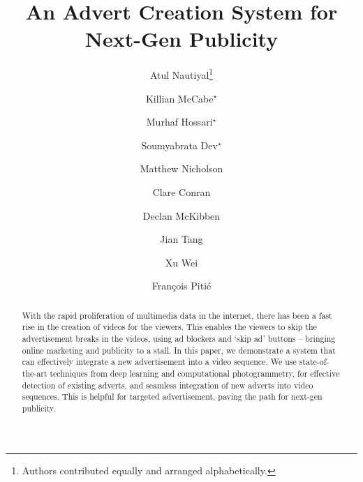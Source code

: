 \documentclass[runningheads]{llncs}
\begin{document}
%
\title{An Advert Creation System for \\Next-Gen Publicity }
%

\author{
Atul Nautiyal\thanks{Authors contributed equally and arranged alphabetically.} \and
Killian McCabe$^{\star}$ \and
Murhaf Hossari$^{\star}$ \and 
Soumyabrata Dev$^{\star}$ \and 
Matthew Nicholson \and  
Clare Conran \and 
Declan McKibben \and 
Jian Tang \and 
Xu Wei \and 
Fran\c{c}ois Piti\'e
}
%
%




\maketitle              %
%
\begin{abstract}
With the rapid proliferation of multimedia data in the internet, there has been a fast rise in the creation of videos for the viewers. This enables the viewers to skip the advertisement breaks in the videos, using ad blockers and `skip ad' buttons -- bringing online marketing and publicity to a stall. In this paper, we demonstrate a system that can effectively integrate a new advertisement into a video sequence. We use state-of-the-art techniques from deep learning and computational photogrammetry, for effective detection of existing adverts, and seamless integration of new adverts into video sequences. This is helpful for targeted advertisement, paving the path for next-gen publicity.

\end{abstract}
%
%
%
\end{document}
